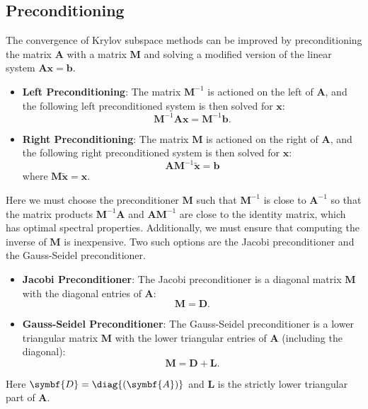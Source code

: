 \documentclass{article}
\begin{document}
\subsection{Preconditioning}
The convergence of Krylov subspace methods can be improved by
preconditioning the matrix \(\symbf{A}\) with a matrix \(\symbf{M}\)
and solving a modified version of the linear system \(\symbf{A}
\symbf{x} = \symbf{b}\).
\begin{itemize}
    \item \textbf{Left Preconditioning}: The matrix \(\symbf{M}^{-1}\) is
          actioned on the left of \(\symbf{A}\), and the following left
          preconditioned system is then solved for \(\symbf{x}\):
          \begin{equation*}
              \symbf{M}^{-1} \symbf{A} \symbf{x} = \symbf{M}^{-1} \symbf{b}.
          \end{equation*}
    \item \textbf{Right Preconditioning}: The matrix \(\symbf{M}\) is
          actioned on the right of \(\symbf{A}\), and the following right
          preconditioned system is then solved for \(\symbf{x}\):
          \begin{equation*}
              \symbf{A} \symbf{M}^{-1} \tilde{\symbf{x}} = \symbf{b}
          \end{equation*}
          where \(\symbf{M} \tilde{\symbf{x}} = \symbf{x}\).
\end{itemize}
Here we must choose the preconditioner \(\symbf{M}\) such that \(\symbf{M}^{-1}\)
is close to \(\symbf{A}^{-1}\) so that the matrix products
\(\symbf{M}^{-1} \symbf{A}\) and \(\symbf{A} \symbf{M}^{-1}\) are close
to the identity matrix, which has optimal spectral properties. Additionally,
we must ensure that computing the inverse of \(\symbf{M}\) is inexpensive.
Two such options are the Jacobi preconditioner and the
Gauss-Seidel preconditioner.
\begin{itemize}
    \item \textbf{Jacobi Preconditioner}: The Jacobi preconditioner is
          a diagonal matrix \(\symbf{M}\) with the diagonal entries of \(\symbf{A}\):
          \begin{equation*}
              \symbf{M} = \symbf{D}.
          \end{equation*}
    \item \textbf{Gauss-Seidel Preconditioner}: The Gauss-Seidel
          preconditioner is a lower triangular matrix \(\symbf{M}\) with the
          lower triangular entries of \(\symbf{A}\) (including the diagonal):
          \begin{equation*}
              \symbf{M} = \symbf{D} + \symbf{L}.
          \end{equation*}
\end{itemize}
Here \(\symbf{D} = \diag{\left( \symbf{A} \right)}\) and \(\symbf{L}\)
is the strictly lower triangular part of \(\symbf{A}\).
\end{document}
